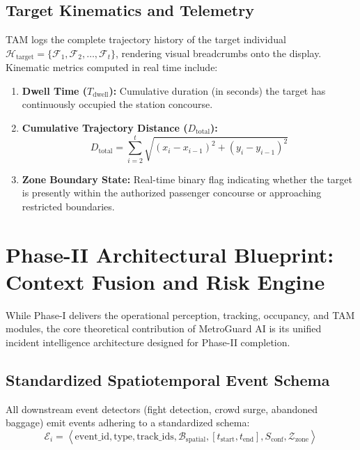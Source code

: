 \documentclass[12pt,a4paper]{report}
\begin{document}
\subsection{Target Kinematics and Telemetry}
TAM logs the complete trajectory history of the target individual $\mathcal{H}_{\text{target}} = \{ \mathcal{F}_1, \mathcal{F}_2, \dots, \mathcal{F}_t \}$, rendering visual breadcrumbs onto the display. Kinematic metrics computed in real time include:
\begin{enumerate}
    \item \textbf{Dwell Time ($T_{\text{dwell}}$):} Cumulative duration (in seconds) the target has continuously occupied the station concourse.
    \item \textbf{Cumulative Trajectory Distance ($D_{\text{total}}$):}
    \begin{equation}
        D_{\text{total}} = \sum_{i=2}^{t} \sqrt{ (x_i - x_{i-1})^2 + (y_i - y_{i-1})^2 }
    \end{equation}
    \item \textbf{Zone Boundary State:} Real-time binary flag indicating whether the target is presently within the authorized passenger concourse or approaching restricted boundaries.
\end{enumerate}

\section{Phase-II Architectural Blueprint: Context Fusion and Risk Engine}
While Phase-I delivers the operational perception, tracking, occupancy, and TAM modules, the core theoretical contribution of MetroGuard AI is its unified incident intelligence architecture designed for Phase-II completion.

\subsection{Standardized Spatiotemporal Event Schema}
All downstream event detectors (fight detection, crowd surge, abandoned baggage) emit events adhering to a standardized schema:
\begin{equation}
    \mathcal{E}_i = \left\langle \text{event\_id}, \text{type}, \text{track\_ids}, \mathcal{B}_{\text{spatial}}, [t_{\text{start}}, t_{\text{end}}], S_{\text{conf}}, \mathcal{Z}_{\text{zone}} \right\rangle
\end{equation}
\end{document}
